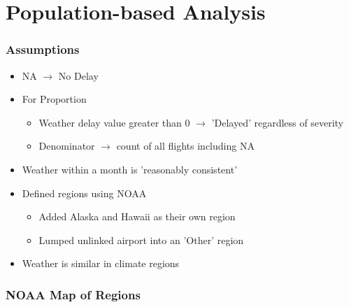 \documentclass{beamer}
\begin{document}
\section{Population-based Analysis}
\begin{frame}
\frametitle{Assumptions} 
\begin{itemize}
\item NA $\rightarrow$ No Delay

\item For Proportion
\begin{itemize}
\item Weather delay value greater than 0 $\rightarrow$ 'Delayed' regardless of severity 
\item Denominator $\rightarrow$ count of all flights including NA
\end{itemize}

\item Weather within a month is 'reasonably consistent'

\item Defined regions using NOAA 
\begin{itemize}
\item Added Alaska and Hawaii as their own region
\item Lumped unlinked airport into an 'Other' region
\end{itemize}

\item Weather is similar in climate regions

\end{itemize}
\end{frame}





\begin{frame}
\frametitle{NOAA Map of Regions}
\begin{center}
\end{center}
\end{frame}
\end{document}
